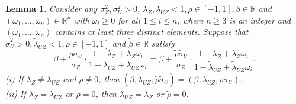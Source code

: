 \documentclass[11pt]{article}
\newtheorem{lemma}{Lemma}
\theoremstyle{definition}
\theoremstyle{remark}
\begin{document}
\begin{lemma}\label{lem:lcar-flex-expectation}
Consider any $\sigma^2_Z, \sigma^2_U > 0$, $\lambda_Z, \lambda_{UZ} < 1, \rho \in [-1, 1], \beta \in \mathbb{R}$ and $(\omega_1,\ldots,\omega_n) \in \mathbb{R}^n$ with $\omega_i \ge 0$ for all $1 \le i \le n$, where $n \ge 3$ is an integer and $(\omega_1,\ldots,\omega_n)$ contains at least three distinct elements. Suppose that $\tilde{\sigma}_U^2 > 0, \tilde{\lambda}_{UZ} < 1, \tilde\rho \in [-1, 1]$ and $\tilde{\beta}\in\mathbb{R}$ satisfy
\begin{equation}\label{eq:lcar-flex-expectation}
\beta + \frac{\rho\sigma_U}{\sigma_Z} \cdot \frac{1-\lambda_Z + \lambda_Z \omega_i}{1- \lambda_{UZ} + \lambda_{UZ} \omega_i} = \tilde\beta + \frac{\tilde\rho \tilde\sigma_U}{\sigma_Z} \cdot \frac{1-\lambda_Z + \lambda_Z \omega_i}{1- \tilde\lambda_{UZ} + \tilde\lambda_{UZ} \omega_i}.
\end{equation}
(i) If $\lambda_Z \neq \lambda_{UZ}$ and $\rho \neq 0$, then  $(\tilde\beta, \tilde\lambda_{UZ}, \tilde\rho \tilde\sigma_U) = (\beta, \lambda_{UZ}, \rho\sigma_U)$. \\
(ii) If $\lambda_Z = \lambda_{UZ}$ or $\rho=0$, then  $\tilde\lambda_{UZ} = \lambda_Z$ or $\tilde{\rho}=0$. 
\end{lemma}
\end{document}
